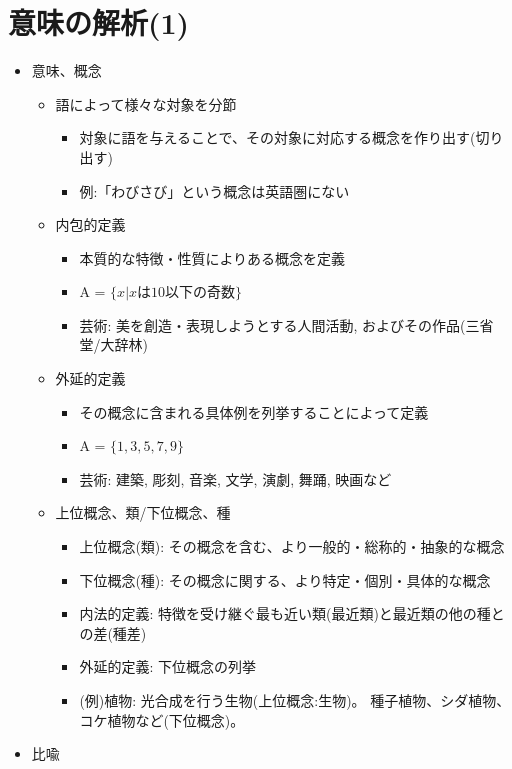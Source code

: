 \documentclass[a4j,11pt]{jsarticle}
\begin{document}
\section{意味の解析(1)}
\begin{itemize}
 \item 意味、概念
       \begin{itemize}
	\item 語によって様々な対象を分節
	      \begin{itemize}
	       \item 対象に語を与えることで、その対象に対応する概念を作り出す(切り出す)
	       \item 例:「わびさび」という概念は英語圏にない
	      \end{itemize}
	\item 内包的定義
	      \begin{itemize}
	       \item 本質的な特徴・性質によりある概念を定義
	       \item A = $\{x|xは10以下の奇数\}$
	       \item 芸術: 美を創造・表現しようとする人間活動, およびその作品(三省堂/大辞林)
	      \end{itemize}
	\item 外延的定義
	      \begin{itemize}
	       \item その概念に含まれる具体例を列挙することによって定義
	       \item A = $\{1,3,5,7,9\}$
	       \item 芸術: 建築, 彫刻, 音楽, 文学, 演劇, 舞踊, 映画など
	      \end{itemize}
	\item 上位概念、類/下位概念、種
	      \begin{itemize}
	       \item 上位概念(類): その概念を含む、より一般的・総称的・抽象的な概念
	       \item 下位概念(種): その概念に関する、より特定・個別・具体的な概念
	       \item 内法的定義: 特徴を受け継ぐ最も近い類(最近類)と最近類の他の種との差(種差)
	       \item 外延的定義: 下位概念の列挙
	       \item (例)植物: 光合成を行う生物(上位概念:生物)。
		     種子植物、シダ植物、コケ植物など(下位概念)。
	      \end{itemize}
       \end{itemize}
 \item 比喩

\end{itemize}
\end{document}
